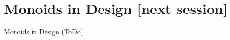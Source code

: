 \documentclass{beamer}
\begin{document}
\section{Monoids in Design \alert{[next session]}}

\begin{frame}{Monoids in Design (ToDo)}
\end{frame}


\end{document}
